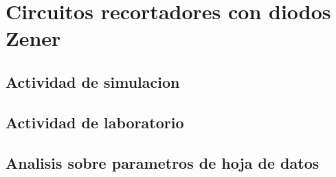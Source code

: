 \documentclass[chaptersright]{informeutn}
\begin{document}
  \part{Circuitos recortadores con diodos Zener}
    \chapter{Actividad de simulacion}
    \chapter{Actividad de laboratorio}
    \chapter{Analisis sobre parametros de hoja de datos}

  \printbibliography
\end{document}
